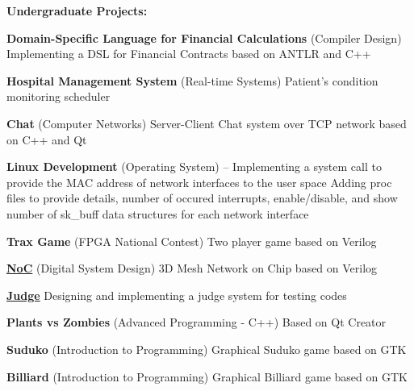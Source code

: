 \documentclass[a4paper,9pt,oneside]{article}
\begin{document}
\begin{body}
\textbf{Undergraduate Projects:}

\BulletItem
\textbf{Domain-Specific Language for Financial Calculations} (Compiler Design)
\hfill
{}
\SubBulletItem
Implementing a DSL for Financial Contracts based on ANTLR and C++

\BulletItem
\textbf{Hospital Management System} (Real-time Systems)
\hfill
{}
\SubBulletItem
Patient's condition monitoring scheduler


\BulletItem
\textbf{Chat} (Computer Networks)
\hfill
{}
\SubBulletItem
Server-Client Chat system over TCP network based on C++ and Qt

\BulletItem
\textbf{Linux Development} (Operating System)
\hfill
{} -- 
\SubBulletItem
Implementing a system call to provide the MAC address of network interfaces to the user space
\SubBulletItem
Adding proc files to provide details, number of occured interrupts, enable/disable, and show number of sk\_buff data structures for each network interface

\BulletItem
\textbf{Trax Game} (FPGA National Contest)
\hfill
{}
\SubBulletItem
Two player game based on Verilog

\BulletItem
\href{https://github.com/arminvakil/NoC}
{\textbf{NoC}} (Digital System Design)
\hfill
{}
\SubBulletItem
3D Mesh Network on Chip based on Verilog

\BulletItem
\href{https://github.com/Rmin1995/Judge}
{\textbf{Judge}}
\hfill
{}
\SubBulletItem
Designing and implementing a judge system for testing codes

\BulletItem
\textbf{Plants vs Zombies} (Advanced Programming - C++)
\hfill
{}
\SubBulletItem
Based on Qt Creator

\BulletItem
\textbf{Suduko} (Introduction to Programming)
\hfill
{}
\SubBulletItem
Graphical Suduko game based on GTK

\BulletItem
\textbf{Billiard} (Introduction to Programming)
\hfill
{}
\SubBulletItem
Graphical Billiard game based on GTK


\end{body}
\end{document}
